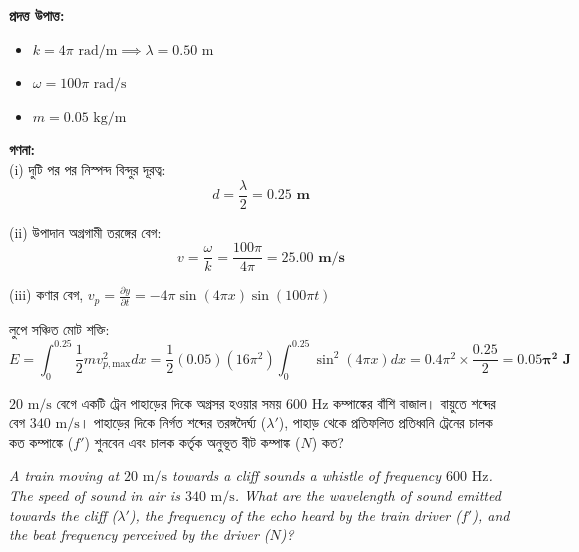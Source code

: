 \documentclass[12pt, a4paper]{article}
\begin{document}
\begin{tcolorbox}[solutionbox={সমাধান (Solution)}]
    \noindent
    \textbf{প্রদত্ত উপাত্ত:}
    \begin{itemize}[leftmargin=1.5em, itemsep=0.2em]
        \item $k = 4\pi\text{ rad/m} \implies \lambda = 0.50\text{ m}$
        \item $\omega = 100\pi\text{ rad/s}$
        \item $m = 0.05\text{ kg/m}$
    \end{itemize}

    \vspace{0.6em}
    \noindent\textbf{গণনা:} \\
    (i) দুটি পর পর নিস্পন্দ বিন্দুর দূরত্ব:
    \[ d = \frac{\lambda}{2} = \mathbf{0.25\text{ m}} \]
    
    (ii) উপাদান অগ্রগামী তরঙ্গের বেগ:
    \[ v = \frac{\omega}{k} = \frac{100\pi}{4\pi} = \mathbf{25.00\text{ m/s}} \]
    
    (iii) কণার বেগ, $v_p = \frac{\partial y}{\partial t} = -4\pi \sin(4\pi x) \sin(100\pi t)$
    
    লুপে সঞ্চিত মোট শক্তি:
    \[ E = \int_0^{0.25} \frac{1}{2} m v_{p,\text{max}}^2 dx = \frac{1}{2}(0.05)(16\pi^2) \int_0^{0.25} \sin^2(4\pi x) dx = 0.4\pi^2 \times \frac{0.25}{2} = \mathbf{0.05\pi^2\text{ J}} \]
\end{tcolorbox}


\begin{tcolorbox}[questionbox={প্রশ্ন (Question) 17}]
    \noindent
    $20\text{ m/s}$ বেগে একটি ট্রেন পাহাড়ের দিকে অগ্রসর হওয়ার সময় $600\text{ Hz}$ কম্পাঙ্কের বাঁশি বাজাল। বায়ুতে শব্দের বেগ $340\text{ m/s}$। পাহাড়ের দিকে নির্গত শব্দের তরঙ্গদৈর্ঘ্য ($\lambda'$), পাহাড় থেকে প্রতিফলিত প্রতিধ্বনি ট্রেনের চালক কত কম্পাঙ্কে ($f'$) শুনবেন এবং চালক কর্তৃক অনুভূত বীট কম্পাঙ্ক ($N$) কত?
    
    \vspace{0.8em}
    \begin{english}
    \noindent\textit{\color{darkgray}
    A train moving at $20\text{ m/s}$ towards a cliff sounds a whistle of frequency $600\text{ Hz}$. The speed of sound in air is $340\text{ m/s}$. What are the wavelength of sound emitted towards the cliff ($\lambda'$), the frequency of the echo heard by the train driver ($f'$), and the beat frequency perceived by the driver ($N$)?
    }
    \end{english}
\end{tcolorbox}
\end{document}

